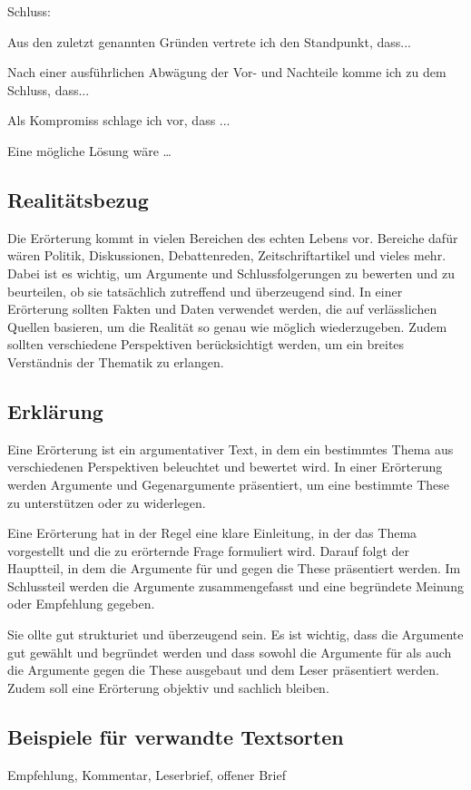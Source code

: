Schluss: 
\begin{compactitem}
    \item Aus den zuletzt genannten Gründen vertrete ich den Standpunkt, dass... 
    \item Nach einer ausführlichen Abwägung der Vor- und Nachteile komme ich zu dem Schluss, dass... 
    \item Als Kompromiss schlage ich vor, dass ...  
    \item Eine mögliche Lösung wäre … 
\end{compactitem}

\subsection{Realitätsbezug}

Die Erörterung kommt in vielen Bereichen des echten Lebens vor.  Bereiche dafür wären Politik, Diskussionen, Debattenreden, Zeitschriftartikel und vieles mehr. Dabei ist es wichtig, um Argumente und Schlussfolgerungen zu bewerten und zu beurteilen, ob sie tatsächlich zutreffend und überzeugend sind. In einer Erörterung sollten Fakten und Daten verwendet werden, die auf verlässlichen Quellen basieren, um die Realität so genau wie möglich wiederzugeben. Zudem sollten verschiedene Perspektiven berücksichtigt werden, um ein breites Verständnis der Thematik zu erlangen. 
\subsection{Erklärung}
Eine Erörterung ist ein argumentativer Text, in dem ein bestimmtes Thema aus verschiedenen Perspektiven beleuchtet und bewertet wird. In einer Erörterung werden Argumente und Gegenargumente präsentiert, um eine bestimmte These zu unterstützen oder zu widerlegen.

Eine Erörterung hat in der Regel eine klare Einleitung, in der das Thema vorgestellt und die zu erörternde Frage formuliert wird. Darauf folgt der Hauptteil, in dem die Argumente für und gegen die These präsentiert werden. Im Schlussteil werden die Argumente zusammengefasst und eine begründete Meinung oder Empfehlung gegeben.

Sie ollte gut strukturiet und überzeugend sein. Es ist wichtig, dass die Argumente gut gewählt und begründet werden und dass sowohl die Argumente für als auch die Argumente gegen die These ausgebaut und dem Leser präsentiert werden. Zudem soll eine Erörterung objektiv und sachlich bleiben.

\subsection{Beispiele für verwandte Textsorten}
Empfehlung, Kommentar, Leserbrief, offener Brief

